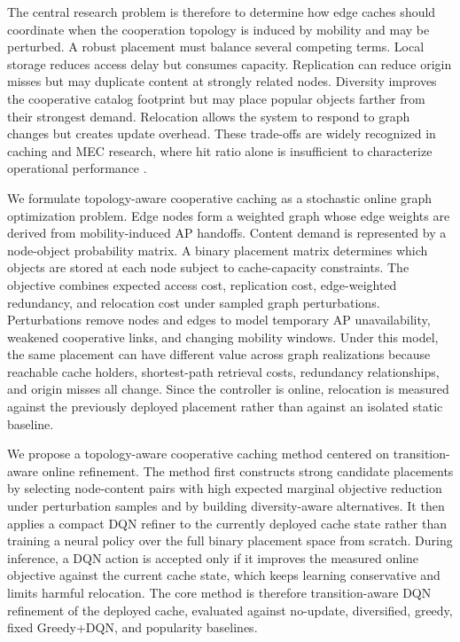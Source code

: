 The central research problem is therefore to determine how edge caches should coordinate when the cooperation topology is induced by mobility and may be perturbed. A robust placement must balance several competing terms. Local storage reduces access delay but consumes capacity. Replication can reduce origin misses but may duplicate content at strongly related nodes. Diversity improves the cooperative catalog footprint but may place popular objects farther from their strongest demand. Relocation allows the system to respond to graph changes but creates update overhead. These trade-offs are widely recognized in caching and MEC research, where hit ratio alone is insufficient to characterize operational performance \cite{Paschos2018RoleCaching,Poularakis2014Approx,Wang2017Mobility}.

We formulate topology-aware cooperative caching as a stochastic online graph optimization problem. Edge nodes form a weighted graph whose edge weights are derived from mobility-induced AP handoffs. Content demand is represented by a node-object probability matrix. A binary placement matrix determines which objects are stored at each node subject to cache-capacity constraints. The objective combines expected access cost, replication cost, edge-weighted redundancy, and relocation cost under sampled graph perturbations. Perturbations remove nodes and edges to model temporary AP unavailability, weakened cooperative links, and changing mobility windows. Under this model, the same placement can have different value across graph realizations because reachable cache holders, shortest-path retrieval costs, redundancy relationships, and origin misses all change. Since the controller is online, relocation is measured against the previously deployed placement rather than against an isolated static baseline.

We propose a topology-aware cooperative caching method centered on transition-aware online refinement. The method first constructs strong candidate placements by selecting node-content pairs with high expected marginal objective reduction under perturbation samples and by building diversity-aware alternatives. It then applies a compact DQN refiner to the currently deployed cache state rather than training a neural policy over the full binary placement space from scratch. During inference, a DQN action is accepted only if it improves the measured online objective against the current cache state, which keeps learning conservative and limits harmful relocation. The core method is therefore transition-aware DQN refinement of the deployed cache, evaluated against no-update, diversified, greedy, fixed Greedy+DQN, and popularity baselines.

